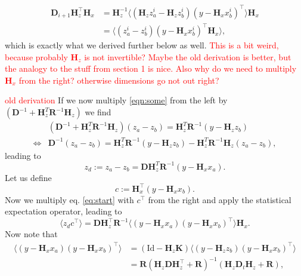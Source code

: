 \documentclass[a4paper,10pt]{article}
\numberwithin{equation}{section}
\begin{document}
\begin{align*}
\mathbf D_{i+1}\mathbf H_z^\top\mathbf H_x&=\mathbf H_z^{-1}\langle (\mathbf H_zz_a^i-\mathbf H_zz_b^i) (y-\mathbf H_x x_b^i)^\top\rangle\mathbf H_x\\
&=\langle (z_a^i-z_b^i) (y-\mathbf H_x x_b^i)^\top\mathbf H_x\rangle,
\end{align*}
which is exactly what we derived further below as well. \textcolor{red}{This is a bit weird, because probably $\mathbf H_z$ is not invertible?  Maybe the old derivation is better, but the analogy to the stuff from section 1 is nice. Also why do we need to multiply $\mathbf H_x$ from the right? otherwise dimensions go not out right?}



\medskip 
\textcolor{red}{old derivation} 
If we now multiply \eqref{eqn:some} from the left by $ \left(\mathbf D^{-1} + \mathbf H_z^T \mathbf R^{-1} \mathbf H_z \right)$
we find
\begin{align*}
&\left(\mathbf D^{-1} + \mathbf H_z^T \mathbf R^{-1}\mathbf  H_z \right)(z_a-z_b) =\mathbf H_z^T \mathbf R^{-1} \left(y - \mathbf H_z z_b\right) \\
\Leftrightarrow &
\mathbf D^{-1} (z_a-z_b)=\mathbf H_z^T \mathbf R^{-1} \left(y - \mathbf H_z z_b\right)  - \mathbf H_z^T \mathbf R^{-1} \mathbf H_z (z_a-z_b),
\end{align*}
leading to
\begin{equation}
z_d:=z_a- z_b =\mathbf D \mathbf H_z^T \mathbf R^{-1} \left(y- \mathbf H_x x_a \right).
\label{eq:start}
\end{equation}
Let us define 
\begin{equation}
c := \mathbf H_x^\top \left(y- \mathbf H_x x_b \right).
\end{equation}
Now we multiply eq. \eqref{eq:start} with $c^\top$ from the right and apply the statistical expectation operator, leading to
\begin{equation}
\langle z_d c^\top\rangle =\mathbf D \mathbf H_z^\top \mathbf R^{-1}\langle  \left(y- \mathbf H_x x_a \right)  \left(y- \mathbf H_x x_b \right)^\top\rangle \mathbf H_x.
\end{equation}
Now note that
\begin{align*}
\langle  \left(y- \mathbf H_x x_a \right)  \left(y- \mathbf H_x x_b \right)^\top\rangle 
&=(\text{Id}-\mathbf H_z \mathbf K)\langle  \left(y-\mathbf H_zz_b \right)  \left(y- \mathbf H_x x_b \right)^\top\rangle \\
&=\mathbf R\left(\mathbf H_z \mathbf D\mathbf H_z^\top +\mathbf R\right)^{-1} (\mathbf H_z\mathbf D_t\mathbf H_z+\mathbf R),
\end{align*}
\end{document}
